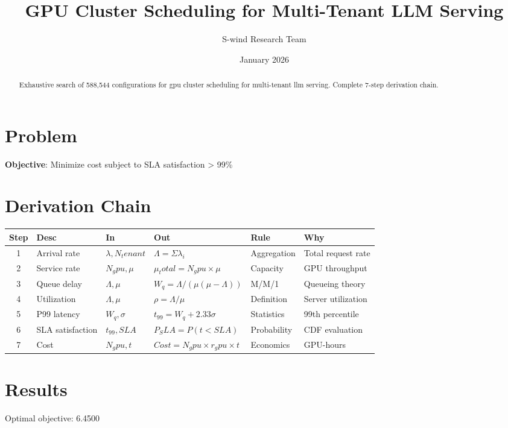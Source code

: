 \documentclass[11pt]{article}
\title{GPU Cluster Scheduling for Multi-Tenant LLM Serving}
\author{S-wind Research Team}
\date{January 2026}
\begin{document}
\maketitle

\begin{abstract}
Exhaustive search of 588,544 configurations for gpu cluster scheduling for multi-tenant llm serving. Complete 7-step derivation chain.
\end{abstract}

\section{Problem}
\textbf{Objective}: Minimize cost subject to SLA satisfaction > 99\%

\section{Derivation Chain}
\begin{longtable}{|c|p{2cm}|p{2cm}|p{3cm}|p{2cm}|p{3cm}|}
\hline
Step & Desc & In & Out & Rule & Why\\\hline\endhead
1 & Arrival rate & $λ, N_tenant$ & $Λ = Σλ_i$ & Aggregation & Total request rate\\\hline
2 & Service rate & $N_gpu, μ$ & $μ_total = N_gpu×μ$ & Capacity & GPU throughput\\\hline
3 & Queue delay & $Λ, μ$ & $W_q = Λ/(μ(μ-Λ))$ & M/M/1 & Queueing theory\\\hline
4 & Utilization & $Λ, μ$ & $ρ = Λ/μ$ & Definition & Server utilization\\\hline
5 & P99 latency & $W_q, σ$ & $t_99 = W_q + 2.33σ$ & Statistics & 99th percentile\\\hline
6 & SLA satisfaction & $t_99, SLA$ & $P_SLA = P(t < SLA)$ & Probability & CDF evaluation\\\hline
7 & Cost & $N_gpu, t$ & $Cost = N_gpu × r_gpu × t$ & Economics & GPU-hours\\\hline
\end{longtable}

\section{Results}
Optimal objective: 6.4500
\end{document}
